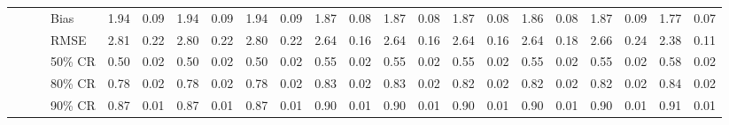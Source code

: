 \begin{table}[ht]
\begin{tabular}{rrllrrrrrrrrrrrrrrrrrr}
   & & & Bias & 1.94 & 0.09 & 1.94 & 0.09 & 1.94 & 0.09 & 1.87 & 0.08 & 1.87 & 0.08 & 1.87 & 0.08 & 1.86 & 0.08 & 1.87 & 0.09 & 1.77 & 0.07 \\ 
   & & & RMSE & 2.81 & 0.22 & 2.80 & 0.22 & 2.80 & 0.22 & 2.64 & 0.16 & 2.64 & 0.16 & 2.64 & 0.16 & 2.64 & 0.18 & 2.66 & 0.24 & 2.38 & 0.11 \\ 
   & & & 50\% CR & 0.50 & 0.02 & 0.50 & 0.02 & 0.50 & 0.02 & 0.55 & 0.02 & 0.55 & 0.02 & 0.55 & 0.02 & 0.55 & 0.02 & 0.55 & 0.02 & 0.58 & 0.02 \\ 
   & & & 80\% CR & 0.78 & 0.02 & 0.78 & 0.02 & 0.78 & 0.02 & 0.83 & 0.02 & 0.83 & 0.02 & 0.82 & 0.02 & 0.82 & 0.02 & 0.82 & 0.02 & 0.84 & 0.02 \\ 
   & & & 90\% CR & 0.87 & 0.01 & 0.87 & 0.01 & 0.87 & 0.01 & 0.90 & 0.01 & 0.90 & 0.01 & 0.90 & 0.01 & 0.90 & 0.01 & 0.90 & 0.01 & 0.91 & 0.01 \\ 
   \hline
\end{tabular}
\end{table}
